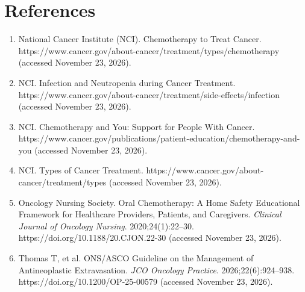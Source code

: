 \section*{References}
\begin{enumerate}
  \item National Cancer Institute (NCI). Chemotherapy to Treat Cancer. https://www.cancer.gov/about-cancer/treatment/types/chemotherapy (accessed November 23, 2026).
  \item NCI. Infection and Neutropenia during Cancer Treatment. https://www.cancer.gov/about-cancer/treatment/side-effects/infection (accessed November 23, 2026).
  \item NCI. Chemotherapy and You: Support for People With Cancer. https://www.cancer.gov/publications/patient-education/chemotherapy-and-you (accessed November 23, 2026).
  \item NCI. Types of Cancer Treatment. https://www.cancer.gov/about-cancer/treatment/types (accessed November 23, 2026).
  \item Oncology Nursing Society. Oral Chemotherapy: A Home Safety Educational Framework for Healthcare Providers, Patients, and Caregivers. \textit{Clinical Journal of Oncology Nursing}. 2020;24(1):22--30. https://doi.org/10.1188/20.CJON.22-30 (accessed November 23, 2026).
  \item Thomas T, et al. ONS/ASCO Guideline on the Management of Antineoplastic Extravasation. \textit{JCO Oncology Practice}. 2026;22(6):924--938. https://doi.org/10.1200/OP-25-00579 (accessed November 23, 2026).
\end{enumerate}

\clearpage
